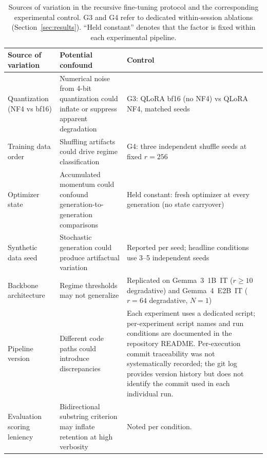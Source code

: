 \documentclass[a4paper,fleqn]{cas-dc}
\newif\ifshowchanges
\newcommand{\rev}[1]{\ifshowchanges{\color{blue}#1}\else{#1}\fi}
\renewcommand{\arraystretch}{1.8}
\begin{document}
\begin{table}[!t]
\renewcommand{\arraystretch}{1.2}
\caption{\rev{Sources of variation in the recursive fine-tuning
protocol and the corresponding experimental control. G3 and G4 refer to
dedicated within-session ablations (Section~\ref{sec:results}). ``Held
constant'' denotes that the factor is \rev{fixed within each experimental pipeline}.}}
\label{tab:controls}
\small
\setlength{\tabcolsep}{4pt}
\begin{tabularx}{\textwidth}{@{}
    >{\raggedright\arraybackslash}p{}
    >{\raggedright\arraybackslash}p{}
    X
@{}}
\toprule
\textbf{Source of variation} &
\textbf{Potential confound} &
\textbf{Control} \\
\midrule

Quantization (NF4 vs bf16) &
Numerical noise from 4-bit quantization could inflate or suppress apparent degradation &
G3: QLoRA bf16 (no NF4) vs QLoRA NF4, matched seeds \\

\addlinespace

Training data order &
Shuffling artifacts could drive regime classification &
G4: three independent shuffle seeds at fixed $r=256$ \\

\addlinespace

Optimizer state &
Accumulated momentum could confound generation-to-generation comparisons &
Held constant: fresh optimizer at every generation (no state carryover) \\

\addlinespace

Synthetic data seed &
Stochastic generation could produce artifactual variation &
Reported per seed; headline conditions use 3--5 independent seeds \\

\addlinespace

Backbone architecture &
Regime thresholds may not generalize &
Replicated on Gemma~3~1B~IT ($r\geq10$ degradative) and Gemma~4~E2B~IT ($r=64$ degradative, $N=1$) \\

\addlinespace

Pipeline version &
Different code paths could introduce discrepancies &
\rev{Each experiment uses a dedicated script; per-experiment script names and run conditions are documented in the repository README. \rev{Per-execution commit traceability was not systematically recorded; the git log provides version history but does not identify the commit used in each individual run.}} \\

\addlinespace

Evaluation scoring leniency &
Bidirectional substring criterion may inflate retention at high verbosity &
Noted per condition. \\

\bottomrule
\end{tabularx}
\end{table}
\end{document}
